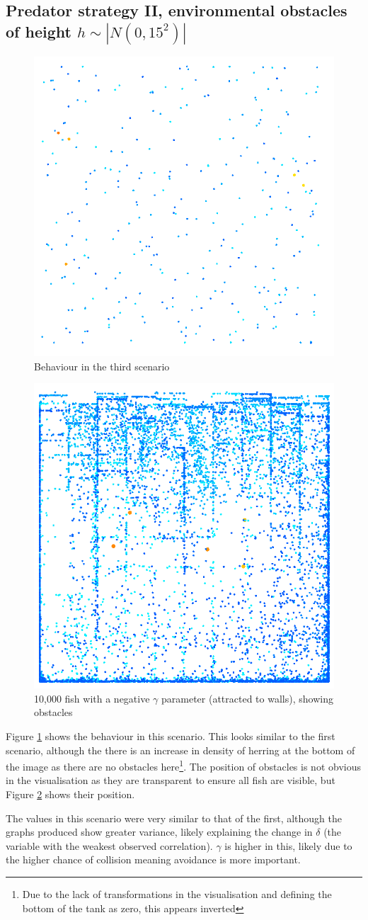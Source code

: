 \documentclass[12pt]{article}
\begin{document}
\subsection{Predator strategy II, environmental obstacles of height $h\sim |N(0, 15^2)
|$ }
\begin{figure}[H]
    \centering
    \includegraphics[width=0.5\linewidth]{fig/iii.png}
    \caption{Behaviour in the third scenario}
    \label{fig:scenarioiii}
\end{figure}
\begin{figure}[H]
    \centering
    \includegraphics[width=0.5\linewidth]{fig/many_fish.png}
    \caption{10,000 fish with a negative $\gamma$ parameter (attracted to walls), showing obstacles}
    \label{fig:forced walls}
\end{figure}
Figure \ref{fig:scenarioiii} shows the behaviour in this scenario. This looks similar to the first scenario, although the there is an increase in density of herring at the bottom of the image as there are no obstacles here\footnote{Due to the lack of transformations in the visualisation and defining the bottom of the tank as zero, this appears inverted}. The position of obstacles is not obvious in the visualisation as they are transparent to ensure all fish are visible, but Figure \ref{fig:forced walls} shows their position.\par
The values in this scenario were very similar to that of the first, although the graphs produced show greater variance, likely explaining the change in $\delta$ (the variable with the weakest observed correlation). $\gamma$ is higher in this, likely due to the higher chance of collision meaning avoidance is more important.
\end{document}
